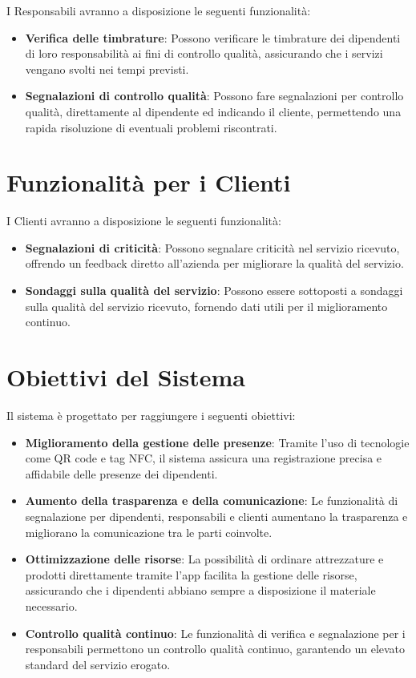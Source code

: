 \documentclass[twoside]{supsistudent}
\begin{document}
I Responsabili avranno a disposizione le seguenti funzionalità:
\begin{itemize}
  \item \textbf{Verifica delle timbrature}: Possono verificare le timbrature dei dipendenti di loro responsabilità ai fini di controllo qualità, assicurando che i servizi vengano svolti nei tempi previsti.
  \item \textbf{Segnalazioni di controllo qualità}: Possono fare segnalazioni per controllo qualità, direttamente al dipendente ed indicando il cliente, permettendo una rapida risoluzione di eventuali problemi riscontrati.
\end{itemize}

\section{Funzionalità per i Clienti}

I Clienti avranno a disposizione le seguenti funzionalità:
\begin{itemize}
  \item \textbf{Segnalazioni di criticità}: Possono segnalare criticità nel servizio ricevuto, offrendo un feedback diretto all'azienda per migliorare la qualità del servizio.
  \item \textbf{Sondaggi sulla qualità del servizio}: Possono essere sottoposti a sondaggi sulla qualità del servizio ricevuto, fornendo dati utili per il miglioramento continuo.
\end{itemize}

\section{Obiettivi del Sistema}

Il sistema è progettato per raggiungere i seguenti obiettivi:
\begin{itemize}
  \item \textbf{Miglioramento della gestione delle presenze}: Tramite l'uso di tecnologie come QR code e tag NFC, il sistema assicura una registrazione precisa e affidabile delle presenze dei dipendenti.
  \item \textbf{Aumento della trasparenza e della comunicazione}: Le funzionalità di segnalazione per dipendenti, responsabili e clienti aumentano la trasparenza e migliorano la comunicazione tra le parti coinvolte.
  \item \textbf{Ottimizzazione delle risorse}: La possibilità di ordinare attrezzature e prodotti direttamente tramite l'app facilita la gestione delle risorse, assicurando che i dipendenti abbiano sempre a disposizione il materiale necessario.
  \item \textbf{Controllo qualità continuo}: Le funzionalità di verifica e segnalazione per i responsabili permettono un controllo qualità continuo, garantendo un elevato standard del servizio erogato.
\end{itemize}
\end{document}
